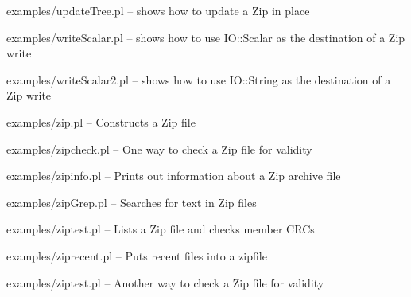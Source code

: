\documentclass[]{article}
\begin{document}
\begin{description}
\item[examples/updateTree.pl -- shows how to update a Zip in place]
\end{description}

\begin{description}
\item[examples/writeScalar.pl -- shows how to use IO::Scalar as the
destination of a Zip write]
\end{description}

\begin{description}
\item[examples/writeScalar2.pl -- shows how to use IO::String as the
destination of a Zip write]
\end{description}

\begin{description}
\item[examples/zip.pl -- Constructs a Zip file]
\end{description}

\begin{description}
\item[examples/zipcheck.pl -- One way to check a Zip file for validity]
\end{description}

\begin{description}
\item[examples/zipinfo.pl -- Prints out information about a Zip archive
file]
\end{description}

\begin{description}
\item[examples/zipGrep.pl -- Searches for text in Zip files]
\end{description}

\begin{description}
\item[examples/ziptest.pl -- Lists a Zip file and checks member CRCs]
\end{description}

\begin{description}
\item[examples/ziprecent.pl -- Puts recent files into a zipfile]
\end{description}

\begin{description}
\item[examples/ziptest.pl -- Another way to check a Zip file for
validity]
\end{description}
\end{document}
